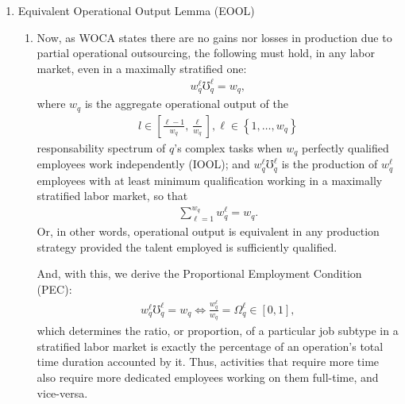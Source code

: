 \documentclass[hidelinks, nonatbib]{elsarticle}
\begin{document}
\begin{enumerate}
    \item Equivalent Operational Output Lemma (EOOL)
    \begin{enumerate}
        \item Now, as WOCA states there are no gains nor losses in production due to partial operational outsourcing, the following must hold, in any labor market, even in a maximally stratified one:
        \begin{gather}
            w_{q}^{\ell}
            \mho_{q}^{\ell}
            =
            w_q
            ,
        \end{gather}
        where $w_q$ is the aggregate operational output of the
        \begin{gather}
            l \in \left[
            \frac{\ell - 1}{w_q}
            ,
            \frac{\ell}{w_q}
            \right]
            ,
            \ell \in 
            \left\{
                1, \dots, w_q
            \right\}
        \end{gather}
        responsability spectrum of $q$'s complex tasks when $w_q$ perfectly qualified employees work independently (IOOL); and $w_{q}^{\ell}\mho_{q}^{\ell}$ is the production of $w_{q}^{\ell}$ employees with at least minimum qualification working in a maximally stratified labor market, so that
        \begin{gather}
            \sum_{\ell=1}^{w_q}
            w_{q}^{\ell}
            =
            w_q
            .
        \end{gather}
        Or, in other words, operational output is equivalent in any production strategy provided the talent employed is sufficiently qualified.

        And, with this, we derive the Proportional Employment Condition (PEC):
        \begin{gather}
            w_{q}^{\ell}
            \mho_{q}^{\ell}
            =
            w_q
            \iff
            \frac{
                w_{q}^{\ell}
            }{
                w_q
            }
            =
            \Omega_{q}^{\ell}
            \in [0,1]
            ,
        \end{gather}
        which determines the ratio, or proportion, of a particular job subtype in a stratified labor market is exactly the percentage of an operation's total time duration accounted by it. Thus, activities that require more time also require more dedicated employees working on them full-time, and vice-versa.
        

\end{enumerate}
\end{enumerate}
\end{document}
